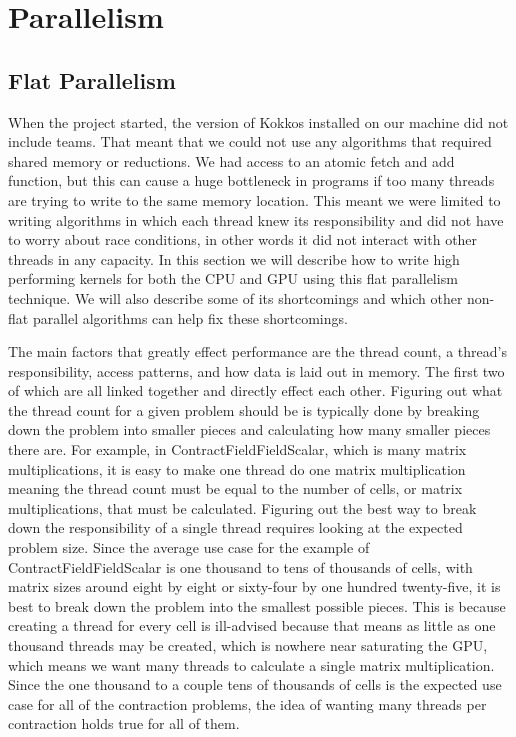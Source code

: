 \chapter{Parallelism}

\section{Flat Parallelism}
When the project started, the version of Kokkos installed on our machine did
not include teams. That meant that we could not use any algorithms that
required shared memory or reductions. We had access to an atomic fetch and add
function, but this can cause a huge bottleneck in programs if too many threads
are trying to write to the same memory location. This meant we were limited to
writing algorithms in which each thread knew its responsibility and did not
have to worry about race conditions, in other words it did not interact with
other threads in any capacity. In this section we will describe how to write
high performing kernels for both the CPU and GPU using this flat parallelism
technique. We will also describe some of its shortcomings and which other
non-flat parallel algorithms can help fix these shortcomings.

The main factors that greatly effect performance are the thread count, a
thread's responsibility, access patterns, and how data is laid out in memory.
The first two of which are all linked together and directly effect each other.
Figuring out what the thread count for a given problem should be is typically
done by breaking down the problem into smaller pieces and calculating how many
smaller pieces there are. For example, in ContractFieldFieldScalar, which is
many matrix multiplications, it is easy to make one thread do one matrix
multiplication meaning the thread count must be equal to the number of cells,
or matrix multiplications, that must be calculated. Figuring out the best way
to break down the responsibility of a single thread requires looking at the
expected problem size. Since the average use case for the example of
ContractFieldFieldScalar is one thousand to tens of thousands of cells, with
matrix sizes around eight by eight or sixty-four by one hundred twenty-five, it
is best to break down the problem into the smallest possible pieces. This is
because creating a thread for every cell is ill-advised because that means as
little as one thousand threads may be created, which is nowhere near saturating
the GPU, which means we want many threads to calculate a single matrix
multiplication. Since the one thousand to a couple tens of thousands of cells
is the expected use case for all of the contraction problems, the idea of
wanting many threads per contraction holds true for all of them. 

